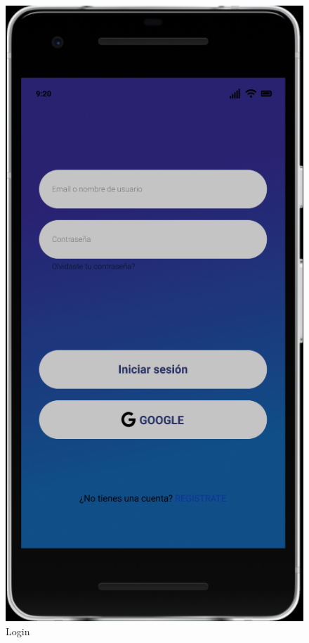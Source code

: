 \documentclass{article}
\begin{document}
\begin{figure}[H]
    \centering
    \includegraphics[scale=0.9]{imgs/Figma/Login}
    \caption{Login}
\end{figure}
\end{document}
